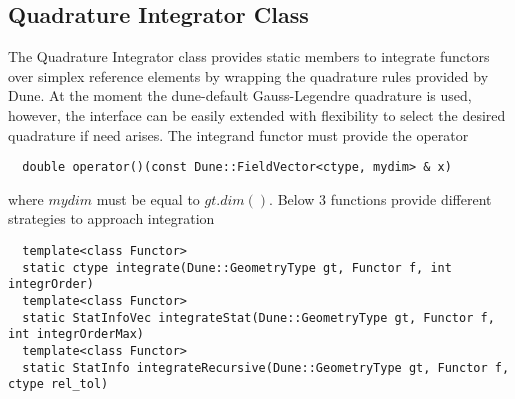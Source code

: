 \subsection{Quadrature Integrator Class}
\label{interface-integrator-quadrature}

The Quadrature Integrator class provides static members to integrate functors over simplex reference elements by wrapping the quadrature rules provided by Dune. At the moment the dune-default Gauss-Legendre quadrature is used, however, the interface can be easily extended with flexibility to select the desired quadrature if need arises. The integrand functor must provide the operator \\

\begin{mybox}
\begin{lstlisting}
  double operator()(const Dune::FieldVector<ctype, mydim> & x)
\end{lstlisting}
\end{mybox}

\noindent
where $mydim$ must be equal to $gt.dim()$. Below 3 functions provide different strategies to approach integration \\

\begin{mybox}
\begin{lstlisting}
  template<class Functor>
  static ctype integrate(Dune::GeometryType gt, Functor f, int integrOrder)
  template<class Functor>
  static StatInfoVec integrateStat(Dune::GeometryType gt, Functor f, int integrOrderMax)
  template<class Functor>
  static StatInfo integrateRecursive(Dune::GeometryType gt, Functor f, ctype rel_tol)
\end{lstlisting}
\end{mybox}

